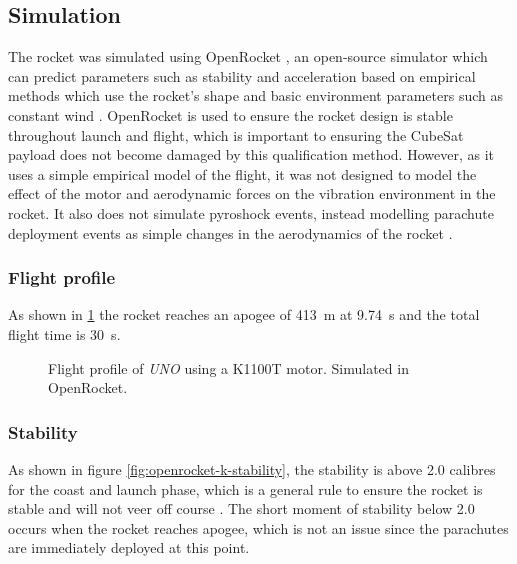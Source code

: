 \documentclass[]{report}
\begin{document}
\subsection{Simulation}

The rocket was simulated using OpenRocket \cite{openrocket,niskanen2009}, an open-source simulator which can predict parameters such as stability and acceleration based on empirical methods which use the rocket's shape and basic environment parameters such as constant wind \cite{doi:10.1177/0954410017752730,niskanen2009}. OpenRocket is used to ensure the rocket design is stable throughout launch and flight, which is important to ensuring the CubeSat payload does not become damaged by this qualification method. However, as it uses a simple empirical model of the flight, it was not designed to model the effect of the motor and aerodynamic forces on the vibration environment in the rocket. It also does not simulate pyroshock events, instead modelling parachute deployment events as simple changes in the aerodynamics of the rocket \cite{niskanen2009}.

\subsubsection{Flight profile}

As shown in \ref{fig:openrocket-k-launch} the rocket reaches an apogee of \SI{413}{\metre} at \SI{9.74}{\second} and the total flight time is \SI{30}{\second}.

\begin{figure}[H]
  
  \caption{Flight profile of \textit{UNO} using a K1100T motor. Simulated in OpenRocket.}
  \label{fig:openrocket-k-launch}
\end{figure}


\subsubsection{Stability}

As shown in figure \ref{fig:openrocket-k-stability}, the stability is above 2.0 calibres for the coast and launch phase, which is a general rule to ensure the rocket is stable and will not veer off course \cite{canepa2005modern}. The short moment of stability below 2.0 occurs when the rocket reaches apogee, which is not an issue since the parachutes are immediately deployed at this point.
\end{document}
